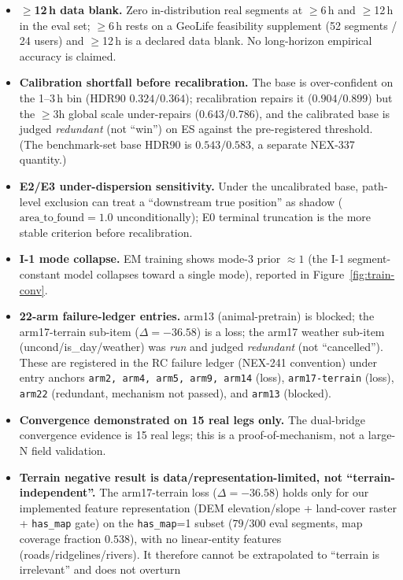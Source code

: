 \documentclass[11pt]{article}
\begin{document}
\begin{itemize}
\item \textbf{$\ge$12\,h data blank.} Zero in-distribution real segments at
$\ge$6\,h and $\ge$12\,h in the eval set; $\ge$6\,h rests on a GeoLife
feasibility supplement (52 segments / 24 users) and $\ge$12\,h is a declared
data blank. No long-horizon empirical accuracy is claimed.
\item \textbf{Calibration shortfall before recalibration.} The base is
over-confident on the 1--3\,h bin (HDR90 $0.324/0.364$); recalibration
repairs it ($0.904/0.899$) but the $\ge$3h global scale under-repairs
(0.643/0.786), and the calibrated base is judged \emph{redundant} (not
``win'') on ES against the pre-registered threshold.  (The benchmark-set base
HDR90 is $0.543/0.583$, a separate NEX-337 quantity.)
\item \textbf{E2/E3 under-dispersion sensitivity.} Under the uncalibrated
base, path-level exclusion can treat a ``downstream true position'' as shadow
($\mathrm{area\_to\_found}=1.0$ unconditionally); E0 terminal truncation is
the more stable criterion before recalibration.
\item \textbf{I-1 mode collapse.} EM training shows mode-3 prior $\approx1$
(the I-1 segment-constant model collapses toward a single mode), reported in
Figure~\ref{fig:train-conv}.
\item \textbf{22-arm failure-ledger entries.} arm13 (animal-pretrain) is
blocked; the arm17-terrain sub-item ($\Delta=-36.58$) is a loss; the arm17
weather sub-item (uncond/is\_day/weather) was \emph{run} and judged
\emph{redundant} (not ``cancelled''). These are registered in the RC failure
ledger (NEX-241 convention) under entry anchors \texttt{arm2, arm4, arm5,
arm9, arm14} (loss), \texttt{arm17-terrain} (loss), \texttt{arm22}
(redundant, mechanism not passed), and \texttt{arm13} (blocked).
\item \textbf{Convergence demonstrated on 15 real legs only.} The dual-bridge
convergence evidence is 15 real legs; this is a proof-of-mechanism, not a
large-N field validation.
\item \textbf{Terrain negative result is data/representation-limited, not
``terrain-independent''.} The arm17-terrain loss ($\Delta=-36.58$) holds only for our
implemented feature representation (DEM elevation/slope + land-cover raster +
\texttt{has\_map} gate) on the \texttt{has\_map}=1 subset ($79/300$ eval segments, map
coverage fraction $0.538$), with no linear-entity features (roads/ridgelines/rivers).
It therefore cannot be extrapolated to ``terrain is irrelevant'' and does not overturn

\end{itemize}
\end{document}
